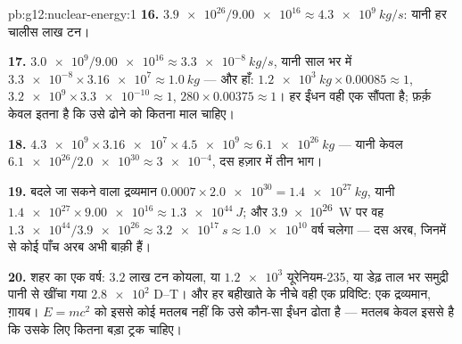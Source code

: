 \begin{solution}{pb:g12:nuclear-energy:1}
\textbf{16.} $\num{3.9e26}/\num{9.00e16} \approx \qty{4.3e9}{kg/s}$: यानी हर  चालीस लाख टन।

\textbf{17.} $\num{3.0e9}/\num{9.00e16} \approx \qty{3.3e-8}{kg/s}$, यानी साल भर में $\num{3.3e-8} \times \num{3.16e7} \approx \qty{1.0}{kg}$ --- और हाँ: $\qty{1.2e3}{kg} \times 0.00085 \approx 1$, $\num{3.2e9}
\times \num{3.3e-10} \approx 1$,
$280 \times 0.00375 \approx 1$। हर ईंधन वही एक  सौंपता है; फ़र्क़ केवल इतना है कि उसे
ढोने को कितना माल चाहिए।

\textbf{18.} $\num{4.3e9} \times \num{3.16e7} \times \num{4.5e9}
\approx \qty{6.1e26}{kg}$ --- यानी केवल $\num{6.1e26}/\num{2.0e30} \approx
\num{3e-4}$, दस हज़ार में तीन भाग।

\textbf{19.} बदले जा सकने वाला द्रव्यमान $0.0007 \times \num{2.0e30} =
\qty{1.4e27}{kg}$, यानी $\num{1.4e27} \times \num{9.00e16} \approx
\qty{1.3e44}{J}$; और \qty{3.9e26}{W} पर
वह $\num{1.3e44}/
\num{3.9e26} \approx \qty{3.2e17}{s} \approx \num{1.0e10}$ वर्ष चलेगा --- दस अरब, जिनमें से कोई पाँच अरब अभी बाक़ी हैं।

\textbf{20.} शहर का एक वर्ष: $3.2$ लाख टन कोयला, या $\num{1.2e3}$ 
यूरेनियम-235, या डेढ़ ताल भर समुद्री पानी से खींचा गया $\num{2.8e2}$
 D--T। और हर बहीखाते के नीचे वही एक प्रविष्टि: एक
 द्रव्यमान, ग़ायब। $E = mc^2$ को इससे कोई मतलब नहीं कि उसे
कौन-सा ईंधन ढोता है --- मतलब केवल इससे है कि उसके लिए कितना बड़ा ट्रक चाहिए।
\end{solution}
